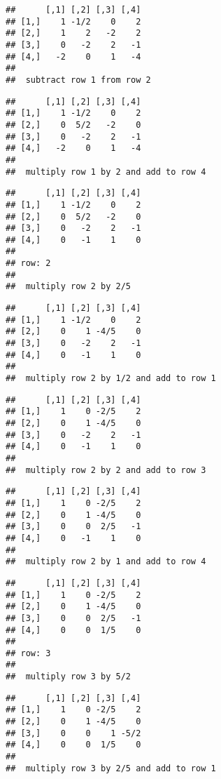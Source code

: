 \documentclass[
  10pt,
  a4paper,
]{article}
\begin{document}
\begin{verbatim}
##      [,1] [,2] [,3] [,4]
## [1,]    1 -1/2    0    2
## [2,]    1    2   -2    2
## [3,]    0   -2    2   -1
## [4,]   -2    0    1   -4
## 
##  subtract row 1 from row 2
\end{verbatim}

\begin{verbatim}
##      [,1] [,2] [,3] [,4]
## [1,]    1 -1/2    0    2
## [2,]    0  5/2   -2    0
## [3,]    0   -2    2   -1
## [4,]   -2    0    1   -4
## 
##  multiply row 1 by 2 and add to row 4
\end{verbatim}

\begin{verbatim}
##      [,1] [,2] [,3] [,4]
## [1,]    1 -1/2    0    2
## [2,]    0  5/2   -2    0
## [3,]    0   -2    2   -1
## [4,]    0   -1    1    0
## 
## row: 2 
## 
##  multiply row 2 by 2/5
\end{verbatim}

\begin{verbatim}
##      [,1] [,2] [,3] [,4]
## [1,]    1 -1/2    0    2
## [2,]    0    1 -4/5    0
## [3,]    0   -2    2   -1
## [4,]    0   -1    1    0
## 
##  multiply row 2 by 1/2 and add to row 1
\end{verbatim}

\begin{verbatim}
##      [,1] [,2] [,3] [,4]
## [1,]    1    0 -2/5    2
## [2,]    0    1 -4/5    0
## [3,]    0   -2    2   -1
## [4,]    0   -1    1    0
## 
##  multiply row 2 by 2 and add to row 3
\end{verbatim}

\begin{verbatim}
##      [,1] [,2] [,3] [,4]
## [1,]    1    0 -2/5    2
## [2,]    0    1 -4/5    0
## [3,]    0    0  2/5   -1
## [4,]    0   -1    1    0
## 
##  multiply row 2 by 1 and add to row 4
\end{verbatim}

\begin{verbatim}
##      [,1] [,2] [,3] [,4]
## [1,]    1    0 -2/5    2
## [2,]    0    1 -4/5    0
## [3,]    0    0  2/5   -1
## [4,]    0    0  1/5    0
## 
## row: 3 
## 
##  multiply row 3 by 5/2
\end{verbatim}

\begin{verbatim}
##      [,1] [,2] [,3] [,4]
## [1,]    1    0 -2/5    2
## [2,]    0    1 -4/5    0
## [3,]    0    0    1 -5/2
## [4,]    0    0  1/5    0
## 
##  multiply row 3 by 2/5 and add to row 1
\end{verbatim}
\end{document}
